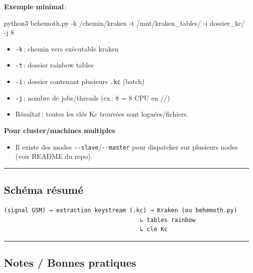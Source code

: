 \documentclass[
  french,
]{article}
\newenvironment{Shaded}{\begin{snugshade}}{\end{snugshade}}
\newcommand{\AttributeTok}[1]{\textcolor[rgb]{0.13,0.29,0.53}{#1}}
\newcommand{\ExtensionTok}[1]{#1}
\newcommand{\NormalTok}[1]{#1}
\providecommand{\tightlist}{%
  \setlength{\itemsep}{0pt}\setlength{\parskip}{0pt}}
\begin{document}
\textbf{Exemple minimal}\,:

\begin{Shaded}
\begin{Highlighting}[]
\ExtensionTok{python3}\NormalTok{ behemoth.py }\AttributeTok{{-}k}\NormalTok{ /chemin/kraken }\AttributeTok{{-}t}\NormalTok{ /mnt/kraken\_tables/ }\AttributeTok{{-}i}\NormalTok{ dossier\_kc/ }\AttributeTok{{-}j}\NormalTok{ 8}
\end{Highlighting}
\end{Shaded}

\begin{itemize}
\tightlist
\item
  \texttt{-k}\,: chemin vers exécutable kraken
\item
  \texttt{-t}\,: dossier rainbow tables
\item
  \texttt{-i}\,: dossier contenant plusieurs \texttt{.kc} (batch)
\item
  \texttt{-j}\,: nombre de jobs/threads (ex\,: 8 = 8 CPU en //)
\item
  Résultat\,: toutes les clés Kc trouvées sont loguées/fichiers.
\end{itemize}

\textbf{Pour cluster/machines multiples}

\begin{itemize}
\tightlist
\item
  Il existe des modes \texttt{-\/-slave}/\texttt{-\/-master} pour
  dispatcher sur plusieurs nodes (voir README du repo).
\end{itemize}

\begin{center}\rule{0.5\linewidth}{0.5pt}\end{center}

\subsection{Schéma résumé}\label{schuxe9ma-ruxe9sumuxe9}

\begin{verbatim}
(signal GSM) → extraction keystream (.kc) → Kraken (ou behemoth.py)
                                       ↳ tables rainbow
                                       ↳ clé Kc
\end{verbatim}

\begin{center}\rule{0.5\linewidth}{0.5pt}\end{center}

\subsection{Notes / Bonnes pratiques}\label{notes-bonnes-pratiques}
\end{document}

